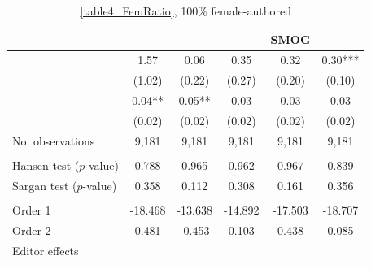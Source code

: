 \begin{table}
    \footnotesize
    \centering
    \begin{threeparttable}
        \caption{\autoref{table4_FemRatio}, 100\% female-authored}
        \label{table4_Fem100}
        \begin{tabular}{p{4cm}S@{}S@{}S@{}S@{}S@{}}
            \toprule
            &{}&{}&{}&{SMOG}&{}\\
            \midrule
            &        1.57   &        0.06   &        0.35   &        0.32   &        0.30***\\
                                          &      {(1.02)}   &      {(0.22)}   &      {(0.27)}   &      {(0.20)}   &      {(0.10)}   \\
            &        0.04** &        0.05** &        0.03   &        0.03   &        0.03   \\
                                          &      {(0.02)}   &      {(0.02)}   &      {(0.02)}   &      {(0.02)}   &      {(0.02)}   \\
            \midrule
            No. observations      &       9,181   &       9,181   &       9,181   &       9,181   &       9,181   \\
             \\\quad Hansen test (\(p\)-value)&       0.788   &       0.965   &       0.962   &       0.967   &       0.839   \\
            \quad Sargan test (\(p\)-value)&       0.358   &       0.112   &       0.308   &       0.161   &       0.356   \\
             \\\quad Order 1&     -18.468   &     -13.638   &     -14.892   &     -17.503   &     -18.707   \\
            \quad Order 2                 &       0.481   &      -0.453   &       0.103   &       0.438   &       0.085   \\
            \midrule
            Editor effects        &           {}   &           {}   &           {}   &           {}   &           {}   \\

\end{tabular}
\end{threeparttable}
\end{table}
